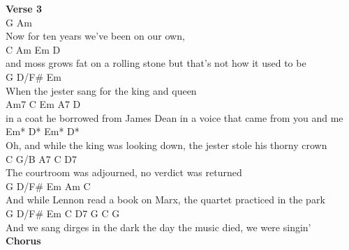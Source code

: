 \documentclass[a4paper]{article}
\begin{document}
{{        }
        \textbf{Verse 3}
        ~\\
        {
            \cutive
            \obeyspaces
         G                   Am
\\
Now for ten years we've been on our own,
\\
      C                   Am          Em                     D
\\
and moss grows fat on a rolling stone but that's not how it used to be
\\
          G     D/F\#            Em
\\
When the jester sang for the king and queen 
\\
     Am7                C                   Em             A7          D
\\
in a coat he borrowed from James Dean in a voice that came from you and me
\\
         Em*                 D*               Em*                 D*
\\
Oh, and while the king was looking down, the jester stole his thorny crown
\\
     C        G/B   A7       C                D7
\\
The courtroom was adjourned, no verdict was returned
\\
          G         D/F\#  Em             Am           C
\\
And while Lennon read a book on Marx, the quartet practiced in the park
\\
    G        D/F\#   Em             C         D7     G  C  G
\\
And we sang dirges in the dark the day the music died, we were singin'
\\

        }
        \textbf{Chorus}
        ~\\
        {
            \cutive
            \obeyspaces

}}
\end{document}
